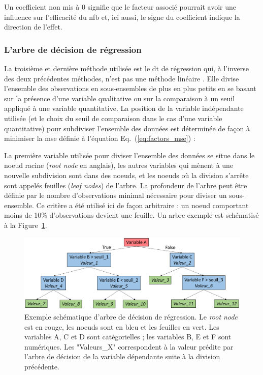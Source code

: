 Un coefficient non mis à 0 signifie que le facteur associé pourrait avoir une influence sur l'efficacité du \gls{nfb} et, ici aussi, 
le signe du coefficient indique la direction de l'effet.

\subsubsection{L'arbre de décision de régression}

La troisième et dernière méthode utilisée est le \gls{dt} de régression qui, à l'inverse des deux précédentes méthodes, n'est pas une méthode 
linéaire \citep{Quinlan1986}. Elle divise l'ensemble des observations en sous-ensembles de plus en plus petits en se basant sur la présence 
d'une variable qualitative ou sur la comparaison à un seuil appliqué à une variable quantitative. La position de la variable indépendante utilisée (et le
choix du seuil de comparaison dans le cas d'une variable quantitative) pour subdiviser l'ensemble des données est déterminée de façon à minimiser la
\gls{mse} définie à l'équation Eq.~(\ref{eq:factors_mse}) :

La première variable utilisée pour diviser l'ensemble des données se situe dans le noeud racine (\textit{root node} en anglais), les autres
variables qui mènent à une nouvelle subdivision sont dans des noeuds, et les noeuds où la division s'arrête sont appelés
feuilles (\textit{leaf nodes}) de l'arbre. La profondeur de l'arbre peut être définie par le nombre d'observations minimal nécessaire
pour diviser un sous-ensemble. Ce critère a été utilisé ici de façon arbitraire : un noeud comportant moins de 10\% d'observations devient une feuille. 
Un arbre exemple est schématisé à la Figure~\ref{Figure:factors_decision_tree_example}.

\begin{figure}[h!]
  \centering
	\includegraphics[width=1.0\linewidth]{figures/chapter-3/decision-tree-example} 
  \caption{Exemple schématique d'arbre de décision de régression. Le \textit{root node} est en rouge, les noeuds sont en bleu et les feuilles en vert. 
	Les variables A, C et D sont catégorielles ; les variables B, E et F sont numériques. Les "Valeurs\_X" correspondent à la valeur 
	prédite par l'arbre de décision de la variable dépendante suite à la division précédente.}
  \label{Figure:factors_decision_tree_example}
\end{figure}

